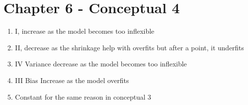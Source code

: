 \documentclass{article}
\begin{document}
\section{Chapter 6 - Conceptual 4}
\begin{enumerate}[label=(\alph*)]
\item I, increase as the model becomes too inflexible
\item II, decrease as the shrinkage help with overfits but after a point, it underfits
\item IV Variance decrease as the model becomes too inflexible
\item III Bias Increase as the model overfits
\item Constant for the same reason in conceptual 3
\end{enumerate}


\newpage
\end{document}
